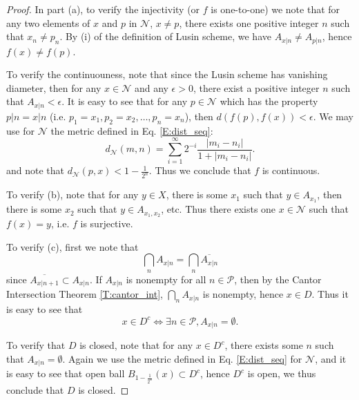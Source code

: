 \begin{proof}
In part (a), to verify the injectivity (or $f$ is one-to-one) we note that for 
any two elements of $x$ and $p$ in $\mathcal{N}$, $x\neq p$, there exists
one positive integer $n$ such that $x_n\neq p_n$. 
By (i) of the definition of Lusin scheme, we have $A_{x|n}\neq A_{p|n}$, hence
$f(x)\neq f(p)$.

To verify the continuouness, note that since the Lusin scheme has vanishing
diameter, then for any $x\in\mathcal{N}$ and any $\epsilon>0$, there exist a 
positive integer $n$ such that $A_{x|n}<\epsilon$. It is easy to see that for
any $p\in\mathcal{N}$ which has the property $p|n=x|n$ (i.e. 
$p_1=x_1, p_2=x_2, \dots, p_n=x_n$), then $d(f(p),f(x))<\epsilon$.
We may use for $\mathcal{N}$ the metric defined in Eq. \ref{E:dist_seq}:
\[
	d_{\mathcal{N}}(m,n) 
	  = \sum_{i=1}^{\infty} 2^{-i} \frac{|m_i-n_i|}{1+|m_i-n_i|}.
\]
and note that $d_{\mathcal{N}}(p,x)<1-\frac{1}{2^n}$. Thus we conclude that $f$
is continuous.

To verify (b), note that for any $y\in X$, there is some $x_1$ such that 
$y\in A_{x_1}$, then there is some $x_2$ such that 
$y\in A_{x_1,x_2}$, etc. Thus there exists one $x\in \mathcal{N}$ such that
$f(x)=y$, i.e. $f$ is surjective.

To verify (c), first we note that
\[
  \bigcap_n A_{x|n} = \bigcap_n \overline{A_{x|n}}
\]
since $\overline{A_{x|n+1}}\subset A_{x|n}$. If $A_{x|n}$ is nonempty for all
$n\in\mathcal{P}$, then by the Cantor Intersection Theorem \ref{T:cantor_int}, 
$\bigcap_n A_{x|n}$ is nonempty, hence $x\in D$. 
Thus it is easy to see that
\[
  x\in D^c \iff \exists n\in\mathcal{P}, A_{x|n}=\emptyset.
\]

To verify that $D$ is closed, note that for any $x\in D^c$, there exists some
$n$ such that $A_{x|n}=\emptyset$. Again we use 
the metric defined in Eq. \ref{E:dist_seq} for $\mathcal{N}$, and it is easy to
see that open ball $B_{1-\frac{1}{2^n}}(x)\subset D^c$, hence $D^c$ is open, we thus 
conclude that $D$ is closed.
\end{proof}

